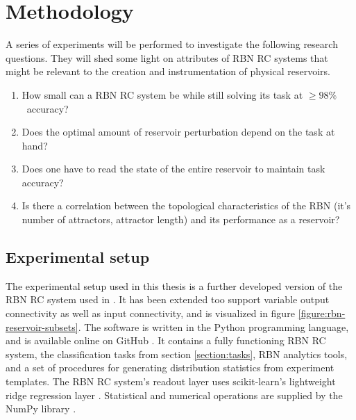 \chapter{Methodology}
\label{chapter:methodology}

A series of experiments will be performed to investigate the following research questions.
They will shed some light on attributes of RBN RC systems that might be relevant to the creation and instrumentation of physical reservoirs.

\begin{enumerate}
    \item How small can a RBN RC system be while still solving its task at $ \geq 98\% $ accuracy?
    \item Does the optimal amount of reservoir perturbation depend on the task at hand?
    \item Does one have to read the state of the entire reservoir to maintain task accuracy?
    \item Is there a correlation between the topological characteristics of the RBN (it's number of attractors, attractor length) and its performance as a reservoir?
\end{enumerate}

\section{Experimental setup}

The experimental setup used in this thesis is a further developed version of the RBN RC system used in \cite{burkow2015evolving}.
It has been extended too support variable output connectivity as well as input connectivity,
and is visualized in figure \ref{figure:rbn-reservoir-subsets}.
The software is written in the Python programming language,
and is available online on GitHub \cite{masters-thesis-code-github}.
It contains a fully functioning RBN RC system,
the classification tasks from section \ref{section:tasks},
RBN analytics tools,
and a set of procedures for generating distribution statistics from experiment templates.
The RBN RC system's readout layer uses scikit-learn's lightweight ridge regression layer \cite{scikit-learn}.
Statistical and numerical operations are supplied by the NumPy library \cite{van2011numpy}.

